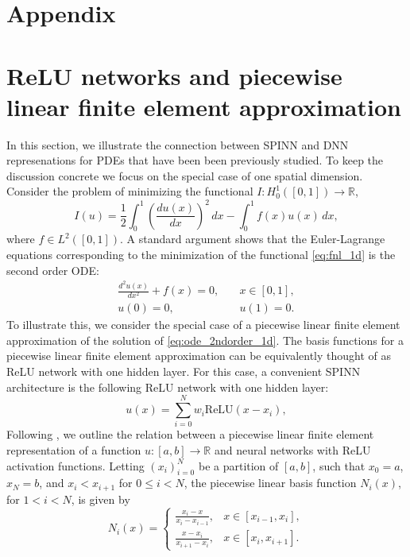 \documentclass[12pt]{article}
\begin{document}
\newpage
\section*{Appendix}
\appendix

\section{ReLU networks and piecewise linear finite element approximation} \label{app:relu_fem_1d}
In this section, we illustrate the connection between SPINN and DNN represenations for PDEs that have been been previously studied. To keep the discussion concrete we focus on the special case of one spatial dimension. Consider the problem of minimizing the functional $I:H^1_0([0,1]) \to \mathbb{R}$,
\begin{equation} \label{eq:fnl_1d}
I(u) = \frac{1}{2}\int_0^1 \left(\frac{du(x)}{dx}\right)^2 \,dx - \int_0^1 f(x)u(x) \,dx,
\end{equation}
where $f \in L^2([0,1])$. A standard argument shows that the Euler-Lagrange equations corresponding to the minimization of the functional \eqref{eq:fnl_1d} is the second order ODE:
\begin{equation} \label{eq:ode_2ndorder_1d}
\begin{split}
\frac{d^2u(x)}{dx^2} + f(x) = 0, & \quad x \in [0,1],\\
u(0) = 0, & \quad u(1) = 0.
\end{split}
\end{equation}
To illustrate this, we consider the special case of a piecewise linear finite element approximation of the solution of \eqref{eq:ode_2ndorder_1d}. The basis functions for a piecewise linear finite element approximation can be equivalently thought of as ReLU network with one hidden layer. For this case, a convenient SPINN architecture is the following ReLU network with one hidden layer:
\begin{equation} \label{eq:spinn_1d}
u(x) = \sum_{i=0}^N w_i \text{ReLU}(x - x_i),
\end{equation}
Following \cite{HLXZ2020}, we outline the relation between a piecewise linear finite element representation of a function $u:[a,b] \to \mathbb{R}$ and neural networks with ReLU activation functions. Letting $(x_i)_{i=0}^N$ be a partition of $[a,b]$, such that $x_0 = a$, $x_N = b$, and $x_i < x_{i+1}$ for $0 \le i < N$, the piecewise linear basis function $N_i(x)$, for $1 < i < N$, is given by
\begin{equation} \label{eq:hat_function_fem_1d}
N_i(x) = \begin{cases}
\frac{x_i - x}{x_i - x_{i-1}}, & x \in [x_{i-1},x_i],\\
\frac{x - x_i}{x_{i+1} - x_i}, & x \in [x_i, x_{i+1}].
\end{cases}
\end{equation}
\end{document}
